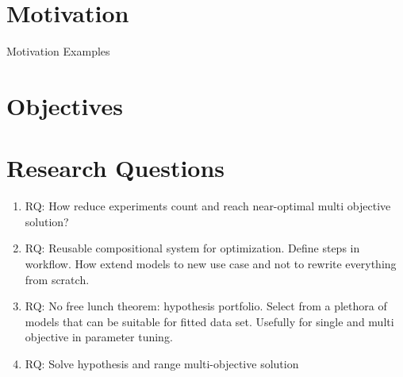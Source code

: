 \section{Motivation}
Motivation Examples

\section{Objectives}

\section{Research Questions}
\begin{enumerate}
    \item RQ: How reduce experiments count and reach near-optimal multi objective solution?
    \item RQ: Reusable compositional system for optimization. Define steps in workflow. How extend models to new use case and not to rewrite everything from scratch.
    \item RQ: No free lunch theorem: hypothesis portfolio. Select from a plethora of models that can be suitable for fitted data set. Usefully for single and multi objective in parameter tuning.
    \item RQ: Solve hypothesis and range multi-objective solution
\end{enumerate}


